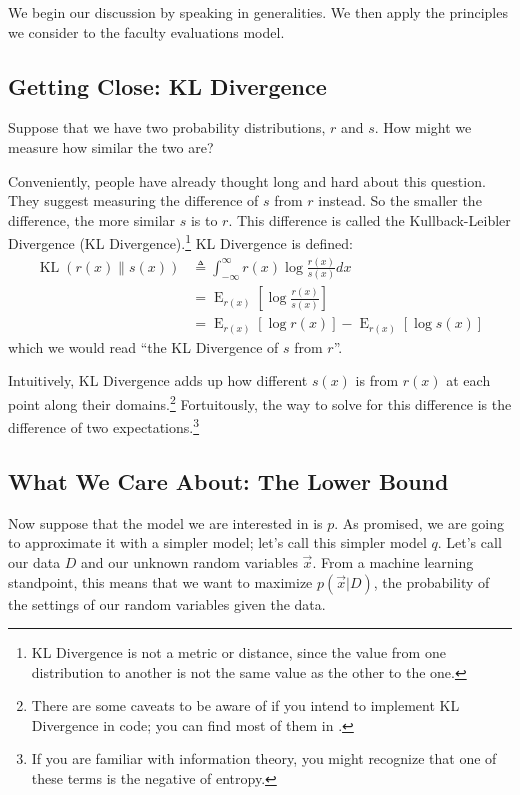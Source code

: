 \documentclass[12pt]{article}
\newcommand{\KL}{\operatorname{KL}}
\newcommand{\E}{\operatorname{E}}
\begin{document}
We begin our discussion by speaking in generalities.  We then apply the
principles we consider to the faculty evaluations model.

\subsection{Getting Close:  KL Divergence}

Suppose that we have two probability distributions, $r$ and $s$.  How might we
measure how similar the two are?

Conveniently, people have already thought long and hard about this question.
They suggest measuring the difference of $s$ from $r$ instead.  So the smaller
the difference, the more similar $s$ is to $r$.  This difference is called the
Kullback-Leibler Divergence (KL Divergence).\footnote{KL Divergence is not a
metric or distance, since the value from one distribution to another is not the
same value as the other to the one.} KL Divergence is defined:
\begin{align}\label{eq:kldivergence}
    \KL(r(x)\parallel s(x)) &\triangleq \int_{-\infty}^{\infty} r(x)
    \log{\frac{r(x)}{s(x)}}dx
    \nonumber \\
    &= \E_{r(x)}[\log \frac{r(x)}{s(x)}]
    \nonumber \\
    &= \E_{r(x)}[\log r(x)] - \E_{r(x)}[\log s(x)]
\end{align}
which we would read \enquote{the KL Divergence of $s$ from $r$}.

Intuitively, KL Divergence adds up how different $s(x)$ is from $r(x)$ at each
point along their domains.\footnote{There are some caveats to be aware of if you
intend to implement KL Divergence in code; you can find most of them in
\autocite{wikikl}.}  Fortuitously, the way to solve for this difference is the
difference of two expectations.\footnote{If you are familiar with information
theory, you might recognize that one of these terms is the negative of entropy.}

\subsection{What We Care About:  The Lower Bound}

Now suppose that the model we are interested in is $p$.  As promised, we are
going to approximate it with a simpler model; let's call this simpler model $q$.
Let's call our data $D$ and our unknown random variables $\vec{x}$.  From a
machine learning standpoint, this means that we want to maximize $p(\vec{x}|D)$,
the probability of the settings of our random variables given the data.
\end{document}

